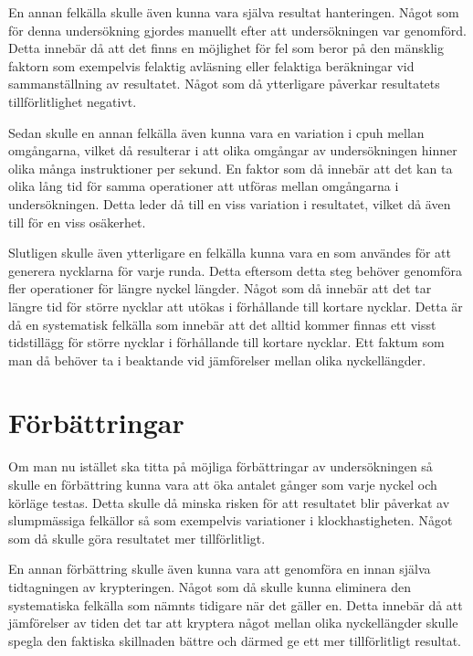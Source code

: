 En annan felkälla skulle även kunna vara själva resultat hanteringen. Något som för denna undersökning gjordes manuellt efter att undersökningen var genomförd. Detta innebär då att
det finns en möjlighet för fel som beror på den mänsklig faktorn som exempelvis felaktig avläsning eller felaktiga beräkningar vid sammanställning av resultatet. Något som då ytterligare
påverkar resultatets tillförlitlighet negativt. %

Sedan skulle en annan felkälla även kunna vara en variation i \gls{cpuh} mellan omgångarna, vilket då resulterar i att olika omgångar av undersökningen hinner olika många instruktioner
per sekund. En faktor som då innebär att det kan ta olika lång tid för samma operationer att utföras mellan omgångarna i undersökningen. Detta leder då till en viss variation i resultatet,
vilket då även till för en viss osäkerhet. %

Slutligen skulle även ytterligare en felkälla kunna vara en som användes för att generera nycklarna för varje runda. Detta eftersom detta steg behöver genomföra fler operationer för längre nyckel längder.
Något som då innebär att det tar längre tid för större nycklar att utökas i förhållande till kortare nycklar. Detta är då en systematisk felkälla som innebär att det alltid kommer
finnas ett visst tidstillägg för större nycklar i förhållande till kortare nycklar. Ett faktum som man då behöver ta i beaktande vid jämförelser mellan olika nyckellängder. %

\section{Förbättringar} %
\label{sec:improvements}
Om man nu istället ska titta på möjliga förbättringar av undersökningen så skulle en förbättring kunna vara att öka antalet gånger som varje nyckel och körläge testas. Detta skulle då
minska risken för att resultatet blir påverkat av slumpmässiga felkällor så som exempelvis variationer i klockhastigheten. Något som då skulle göra resultatet mer tillförlitligt. %

En annan förbättring skulle även kunna vara att genomföra en innan själva tidtagningen av krypteringen. Något som då skulle kunna eliminera den systematiska
felkälla som nämnts tidigare när det gäller en. Detta innebär då att jämförelser av tiden det tar att kryptera något mellan olika nyckellängder skulle spegla
den faktiska skillnaden bättre och därmed ge ett mer tillförlitligt resultat. %

